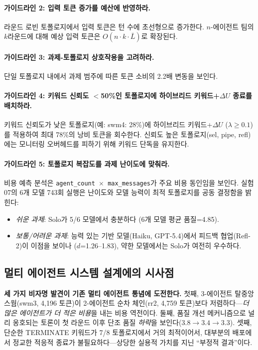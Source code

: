 \documentclass[a4paper,11pt]{article}
\begin{document}
\paragraph{가이드라인 2: 입력 토큰 증가를 예산에 반영하라.}
라운드 로빈 토폴로지에서 입력 토큰은 턴 수에 초선형으로 증가한다. $n$-에이전트 팀의 $k$라운드에 대해 예상 입력 토큰은 $O(n \cdot k \cdot \bar{L})$로 확장된다.

\paragraph{가이드라인 3: 과제-토폴로지 상호작용을 고려하라.}
단일 토폴로지 내에서 과제 범주에 따른 토큰 소비의 2.2배 변동을 보인다.

\paragraph{가이드라인 4: 키워드 신뢰도 $<$50\%인 토폴로지에 하이브리드 키워드+$\Delta U$ 종료를 배치하라.}
키워드 신뢰도가 낮은 토폴로지(예: swm4: 28\%)에 하이브리드 키워드+$\Delta U$ ($\lambda \geq 0.1$)를 적용하여 최대 78\%의 낭비 토큰을 회수한다. 신뢰도 높은 토폴로지(sel, pipe, refl)에는 모니터링 오버헤드를 피하기 위해 키워드 단독을 유지한다.

\paragraph{가이드라인 5: 토폴로지 복잡도를 과제 난이도에 맞춰라.}
비용 예측 분석은 \texttt{agent\_count $\times$ max\_messages}가 주요 비용 동인임을 보인다. 실험 07의 6개 모델 743회 실행은 난이도와 모델 능력이 최적 토폴로지를 공동 결정함을 밝힌다:
\begin{itemize}
  \item \emph{쉬운 과제}: Solo가 5/6 모델에서 충분하다 (6개 모델 평균 품질=4.85).
  \item \emph{보통/어려운 과제}: 능력 있는 기반 모델(Haiku, GPT-5.4)에서 피드백 협업(Refl-2)이 이점을 보이나 ($d$=1.26--1.83), 약한 모델에서는 Solo가 여전히 우수하다.
\end{itemize}

\subsection{멀티 에이전트 시스템 설계에의 시사점}

\textbf{세 가지 비자명 발견이 기존 멀티 에이전트 통념에 도전한다.} 첫째, 3-에이전트 탈중앙 스웜(swm3, 4,196 토큰)이 2-에이전트 순차 체인(rr2, 4,759 토큰)보다 저렴하다---\emph{더 많은 에이전트가 더 적은 비용}을 내는 비용 역전이다. 둘째, 품질 개선 메커니즘으로 널리 옹호되는 토론이 첫 라운드 이후 단조 품질 \emph{하락}을 보인다($3.8 \to 3.4 \to 3.3$). 셋째, 단순한 TERMINATE 키워드가 7/8 토폴로지에서 거의 최적이어서, 대부분의 배포에서 정교한 적응적 종료가 불필요하다---상당한 실용적 가치를 지닌 ``부정적 결과''이다.
\end{document}
